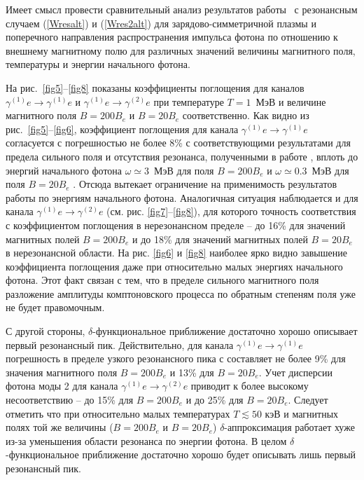 \documentclass[cp1251%
               ]{jetp} %
\begin{document}
Имеет смысл провести сравнительный анализ результатов работы~\cite{Chistyakov:2009}  с резонансным случаем (\ref{Wresalt}) и (\ref{Wres2alt}) для зарядово-симметричной плазмы и поперечного направления распространения импульса фотона по отношению к внешнему магнитному полю для различных значений величины магнитного поля, температуры и энергии начального фотона.

На рис.~\ref{fig5}--\ref{fig8} показаны коэффициенты поглощения для каналов $\gamma^{(1)}e\to\gamma^{(1)}e$ и $\gamma^{(1)}e\to\gamma^{(2)}e$ при температуре $T=1 $~МэВ и величине магнитного поля $B=200B_e$ и $B=20B_e$ соответственно. Как видно из рис.~\ref{fig5}--\ref{fig6}, коэффициент поглощения для канала $\gamma^{(1)}e\to\gamma^{(1)}e$ согласуется с погрешностью не более 8\% с соответствующими результатами для предела сильного поля и отсутствия резонанса, полученными в работе \cite{Chistyakov:2009}, вплоть до энергий начального фотона  $\omega\simeq3$~МэВ для поля $B=200B_e$ и  $\omega\simeq0.3$~МэВ для поля $B=20B_e$ . Отсюда вытекает ограничение на применимость результатов работы \cite{Chistyakov:2009} по энергиям начального фотона. Аналогичная ситуация наблюдается и для канала $\gamma^{(1)}e\to\gamma^{(2)}e$ (см. рис. \ref{fig7}--\ref{fig8}), для которого точность соответствия с коэффициентом поглощения в нерезонансном пределе -- до 16\% для значений магнитных полей $B=200B_e$ и до 18\% для значений магнитных полей $B=20B_e$ в нерезонансной области.  На рис. \ref{fig6} и \ref{fig8} наиболее ярко видно завышение коэффициента поглощения даже при относительно малых энергиях начального фотона. Этот факт связан с тем, что в пределе сильного магнитного поля разложение амплитуды комптоновского процесса по обратным степеням поля уже не будет правомочным.

С  другой стороны, $\delta$-функциональное приближение достаточно хорошо описывает первый резонансный пик. Действительно, для канала $\gamma^{(1)}e\to\gamma^{(1)}e$ погрешность в пределе узкого резонансного пика с составляет не более 9\% для значения магнитного поля $B=200B_e$ и 13\% для $B=20 B_e$. Учет дисперсии фотона моды 2 для канала $\gamma^{(1)}e\to\gamma^{(2)}e$ приводит к более высокому несоответствию -- до 15\% для $B=200B_e$ и до 25\% для $B=20B_e$.
Следует отметить   что при относительно малых температурах $T\lesssim50$ кэВ и магнитных полях той же величины ($B = 200 B_e$ и $B = 20 B_e$) $\delta$-аппроксимация работает хуже из-за уменьшения области резонанса по энергии фотона. В целом $\delta$-функциональное приближение достаточно хорошо будет описывать лишь первый резонансный пик.
\end{document}
